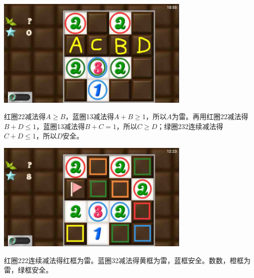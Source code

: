 \subsection{} %
\begin{center}
    \includegraphics[width=0.7\textwidth]{puzzlelow/188-1.jpg}
\end{center}
红圈22减法得$A\ge B$，蓝圈13减法得$A+B\ge 1$，所以$A$为雷。再用红圈22减法得$B+D\le 1$，蓝圈13减法得$B+C=1$，所以$C\ge D$；绿圈232连续减法得$C+D\le 1$，所以$D$安全。
\begin{center}
    \includegraphics[width=0.7\textwidth]{puzzlelow/188-2.jpg}
\end{center}
红圈222连续减法得红框为雷。蓝圈32减法得黄框为雷，蓝框安全。数数，橙框为雷，绿框安全。

